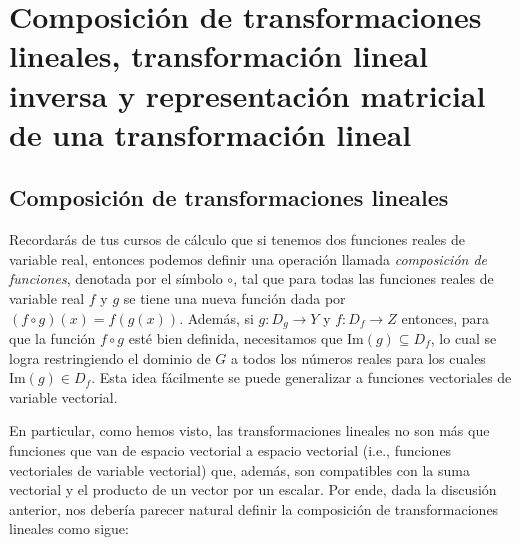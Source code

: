 \documentclass[12pt]{article}
\begin{document}
%
%

\newpage

\section{Composición de transformaciones lineales, transformación lineal inversa y representación matricial de una transformación lineal}

\subsection{Composición de transformaciones lineales}

Recordarás de tus cursos de cálculo que si tenemos dos funciones reales de variable real, entonces podemos definir una operación llamada \emph{composición de funciones}, denotada por el símbolo $\circ$, tal que para todas las funciones reales de variable real $f$ y $g$ se tiene una nueva función dada por $(f\circ g)(x) = f(g(x)).$ Además, si $g:D_g\to Y$ y $f:D_f\to Z$ entonces, para que la función $f\circ g$ esté bien definida, necesitamos que $\text{Im}(g)\subseteq D_f$, lo cual se logra restringiendo el dominio de $G$ a todos los números reales para los cuales $\text{Im}(g)\in D_f$. Esta idea fácilmente se puede generalizar a funciones vectoriales de variable vectorial.

En particular, como hemos visto, las transformaciones lineales no son más que funciones que van de espacio vectorial a espacio vectorial (i.e., funciones vectoriales de variable vectorial) que, además, son compatibles con la suma vectorial y el producto de un vector por un escalar. Por ende, dada la discusión anterior, nos debería parecer natural definir la composición de transformaciones lineales como sigue:
\vspace{3mm}
\end{document}
